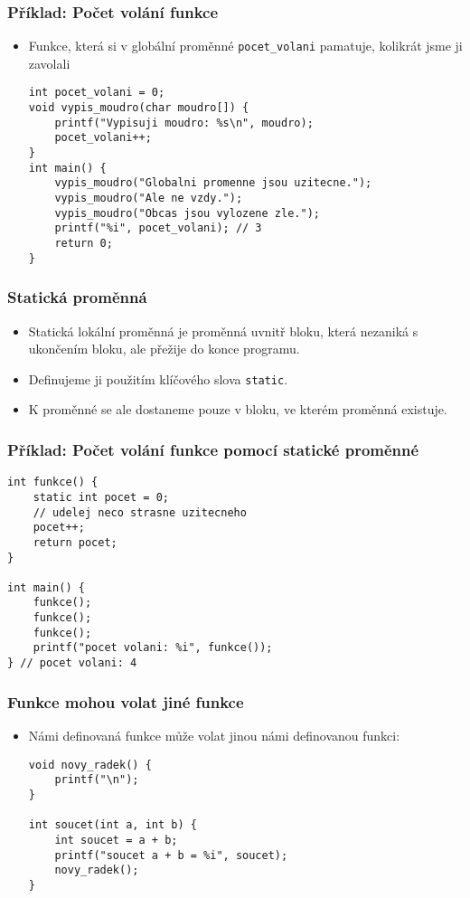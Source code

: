 \documentclass{beamer}
\newenvironment{itemizex}%
  {\large \begin{itemize}%
    \setlength{\itemsep}{8pt}%
    \setlength{\parskip}{8pt}}%
  {\end{itemize}}
\begin{document}
\begin{frame}[t,fragile]\frametitle{Příklad: Počet volání funkce} 
    \begin{itemize}
        \item Funkce, která si v globální proměnné \texttt{pocet\_volani} pamatuje, kolikrát jsme ji zavolali
        \begin{verbatim} 
int pocet_volani = 0;
void vypis_moudro(char moudro[]) {
    printf("Vypisuji moudro: %s\n", moudro);
    pocet_volani++;
}
int main() {
    vypis_moudro("Globalni promenne jsou uzitecne.");
    vypis_moudro("Ale ne vzdy.");
    vypis_moudro("Obcas jsou vylozene zle.");
    printf("%i", pocet_volani); // 3
    return 0;
}
        \end{verbatim}
    \end{itemize}
\end{frame}


\begin{frame}[t,fragile]\frametitle{Statická proměnná} 
    \begin{itemizex}
        \item Statická lokální proměnná je proměnná uvnitř bloku, která nezaniká s ukončením bloku, ale přežije do konce programu.
        \item Definujeme ji použitím klíčového slova \texttt{static}.
        \item K proměnné se ale dostaneme pouze v bloku, ve kterém proměnná existuje.
    \end{itemizex}
\end{frame}


\begin{frame}[t,fragile]\frametitle{Příklad: Počet volání funkce pomocí statické proměnné} 
    \begin{verbatim} 
int funkce() {
    static int pocet = 0;
    // udelej neco strasne uzitecneho
    pocet++;
    return pocet;
}

int main() {
    funkce();
    funkce();
    funkce();
    printf("pocet volani: %i", funkce());
} // pocet volani: 4
    \end{verbatim}
\end{frame}


\begin{frame}[t,fragile]\frametitle{Funkce mohou volat jiné funkce} 
    \begin{itemizex}
        \item Námi definovaná funkce může volat jinou námi definovanou funkci:
        \begin{verbatim} 
void novy_radek() {
    printf("\n");
}

int soucet(int a, int b) {
    int soucet = a + b;
    printf("soucet a + b = %i", soucet);
    novy_radek();
}
        \end{verbatim}
    \end{itemizex}
\end{frame}
\end{document}
